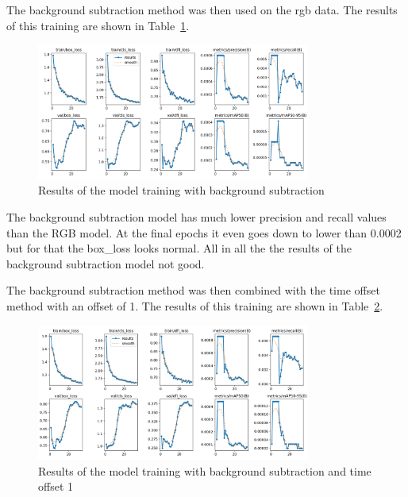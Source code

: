 
The background subtraction method was then used on the rgb data. The results of this training are shown in Table~\ref{fig:results_bgsub}.

\begin{figure}[htbp] 
    \centering
    \includegraphics[width=0.8\textwidth]{images/results/bgsub_results.png}
    \caption{Results of the model training with background subtraction}
    \label{fig:results_bgsub}
\end{figure}

The background subtraction model has much lower precision and recall values than the RGB model. At the final epochs it even goes down to lower than 0.0002 but for that the box\_loss looks normal. All in all the the results of the background subtraction model not good.


The background subtraction method was then combined with the time offset method with an offset of 1. The results of this training are shown in Table~\ref{fig:results_bgsub_timeoffset1}.

\begin{figure}[htbp] 
    \centering
    \includegraphics[width=0.8\textwidth]{images/results/bgsub_timeoffset1_results.png}
    \caption{Results of the model training with background subtraction and time offset 1}
    \label{fig:results_bgsub_timeoffset1}
\end{figure}

